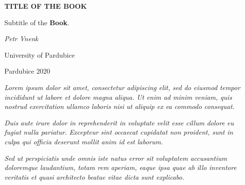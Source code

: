 \documentclass[11pt,b5paper,twoside]{report}										%
\begin{document}



\begin{center}
	\vspace*{2 cm}
	\renewcommand{\baselinestretch}{1.242}\selectfont								%
	\textbf{{\LARGE TITLE OF THE BOOK}}									%
	\thispagestyle{empty}															%
	\renewcommand{\baselinestretch}{1}\selectfont									%
	
	\vspace{0.5 cm}
	Subtitle of the \textbf{Book}.
	
	\vspace{1.5 cm}
	\textit{Petr Vnenk}													%
	
	\vspace{12 cm}
	University of Pardubice												%

	Pardubice 2020														%
\end{center}


\newpage																			%
\textit{Lorem ipsum dolor sit amet, consectetur adipiscing elit, sed do eiusmod tempor incididunt ut labore et dolore magna aliqua. Ut enim ad minim veniam, quis nostrud exercitation ullamco laboris nisi ut aliquip ex ea commodo consequat.}

\textit{Duis aute irure dolor in reprehenderit in voluptate velit esse cillum dolore eu fugiat nulla pariatur. Excepteur sint occaecat cupidatat non proident, sunt in culpa qui officia deserunt mollit anim id est laborum.}

\textit{Sed ut perspiciatis unde omnis iste natus error sit voluptatem accusantium doloremque laudantium, totam rem aperiam, eaque ipsa quae ab illo inventore veritatis et quasi architecto beatae vitae dicta sunt explicabo.}		%
\end{document}
